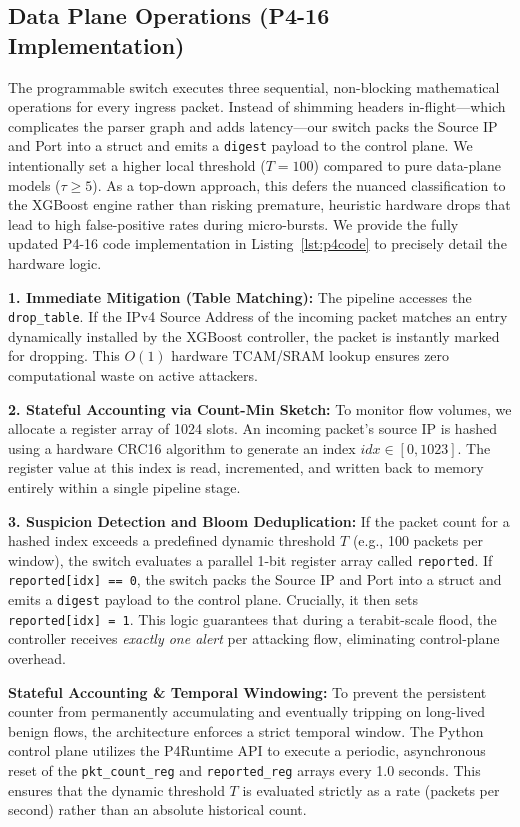 \documentclass[sigconf, nonacm]{acmart}
\begin{document}
\subsection{Data Plane Operations (P4-16 Implementation)}

The programmable switch executes three sequential, non-blocking mathematical operations for every ingress packet. Instead of shimming headers in-flight—which complicates the parser graph and adds latency—our switch packs the Source IP and Port into a struct and emits a \texttt{digest} payload to the control plane. We intentionally set a higher local threshold ($T=100$) compared to pure data-plane models ($\tau \ge 5$). As a top-down approach, this defers the nuanced classification to the XGBoost engine rather than risking premature, heuristic hardware drops that lead to high false-positive rates during micro-bursts. We provide the fully updated P4-16 code implementation in Listing~\ref{lst:p4code} to precisely detail the hardware logic.

\textbf{1. Immediate Mitigation (Table Matching):} The pipeline accesses the \texttt{drop\_table}. If the IPv4 Source Address of the incoming packet matches an entry dynamically installed by the XGBoost controller, the packet is instantly marked for dropping. This $O(1)$ hardware TCAM/SRAM lookup ensures zero computational waste on active attackers.

\textbf{2. Stateful Accounting via Count-Min Sketch:} To monitor flow volumes, we allocate a register array of 1024 slots. An incoming packet's source IP is hashed using a hardware CRC16 algorithm to generate an index $idx \in [0, 1023]$. The register value at this index is read, incremented, and written back to memory entirely within a single pipeline stage.

\textbf{3. Suspicion Detection and Bloom Deduplication:} If the packet count for a hashed index exceeds a predefined dynamic threshold $T$ (e.g., 100 packets per window), the switch evaluates a parallel 1-bit register array called \texttt{reported}. If \texttt{reported[idx] == 0}, the switch packs the Source IP and Port into a struct and emits a \texttt{digest} payload to the control plane. Crucially, it then sets \texttt{reported[idx] = 1}. This logic guarantees that during a terabit-scale flood, the controller receives \textit{exactly one alert} per attacking flow, eliminating control-plane overhead.

\textbf{Stateful Accounting \& Temporal Windowing:} To prevent the persistent counter from permanently accumulating and eventually tripping on long-lived benign flows, the architecture enforces a strict temporal window. The Python control plane utilizes the P4Runtime API to execute a periodic, asynchronous reset of the \texttt{pkt\_count\_reg} and \texttt{reported\_reg} arrays every 1.0 seconds. This ensures that the dynamic threshold $T$ is evaluated strictly as a rate (packets per second) rather than an absolute historical count.
\end{document}
